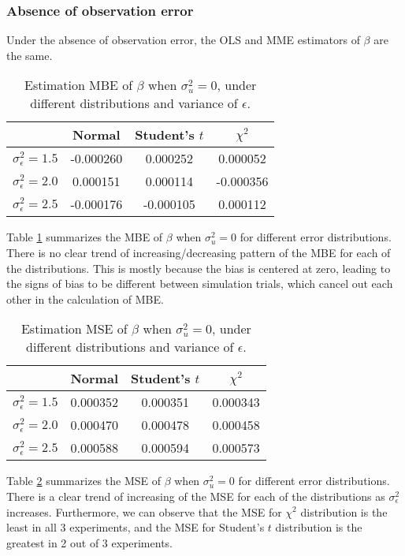 \documentclass{article}
\begin{document}
\subsubsection{Absence of observation error}

Under the absence of observation error, the OLS and MME estimators of $\beta$ are the same.

\begin{table}[ht]
    \centering
    \caption{Estimation MBE of $\beta$ when $\sigma^2_u=0$, under different distributions and variance of $\epsilon$.}
    \label{Tab:MBE_absence}
    \begin{tabular}[t]{lccc}
        \hline
        &Normal&Student's $t$&$\chi^2$\\
        \hline
        $\sigma^2_\epsilon = 1.5$&-0.000260& 0.000252& 0.000052\\
        $\sigma^2_\epsilon = 2.0$& 0.000151& 0.000114&-0.000356\\
        $\sigma^2_\epsilon = 2.5$&-0.000176&-0.000105& 0.000112\\
        \hline
    \end{tabular}
\end{table}

Table \ref{Tab:MBE_absence} summarizes the MBE of $\beta$ when $\sigma^2_u=0$ for different error distributions.
There is no clear trend of increasing/decreasing pattern of the MBE for each of the distributions. 
This is mostly because the bias is centered at zero, leading to the signs of bias to be different between simulation trials, which cancel out each other in the calculation of MBE. 

\begin{table}[ht]
    \centering
    \caption{Estimation MSE of $\beta$ when $\sigma^2_u=0$, under different distributions and variance of $\epsilon$.}
    \label{Tab:MSE_absence}
    \begin{tabular}[t]{lccc}
        \hline
        &Normal&Student's $t$&$\chi^2$\\
        \hline
        $\sigma^2_\epsilon = 1.5$&0.000352&0.000351&0.000343\\
        $\sigma^2_\epsilon = 2.0$&0.000470&0.000478&0.000458\\
        $\sigma^2_\epsilon = 2.5$&0.000588&0.000594&0.000573\\
        \hline
    \end{tabular}
\end{table}

Table \ref{Tab:MSE_absence} summarizes the MSE of $\beta$ when $\sigma^2_u=0$ for different error distributions.
There is a clear trend of increasing of the MSE for each of the distributions as $\sigma^2_\epsilon$ increases. 
Furthermore, we can observe that the MSE for $\chi^2$ distribution is the least in all 3 experiments, and the MSE for Student's $t$ distribution is the greatest in 2 out of 3 experiments.
\end{document}
